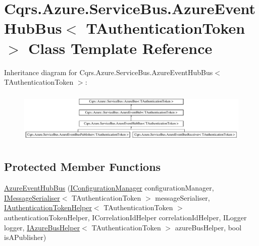 \hypertarget{classCqrs_1_1Azure_1_1ServiceBus_1_1AzureEventHubBus}{}\section{Cqrs.\+Azure.\+Service\+Bus.\+Azure\+Event\+Hub\+Bus$<$ T\+Authentication\+Token $>$ Class Template Reference}
\label{classCqrs_1_1Azure_1_1ServiceBus_1_1AzureEventHubBus}
Inheritance diagram for Cqrs.\+Azure.\+Service\+Bus.\+Azure\+Event\+Hub\+Bus$<$ T\+Authentication\+Token $>$\+:\begin{figure}[H]
\begin{center}
\leavevmode
\includegraphics[height=2.533937cm]{classCqrs_1_1Azure_1_1ServiceBus_1_1AzureEventHubBus}
\end{center}
\end{figure}
\subsection*{Protected Member Functions}
\begin{DoxyCompactItemize}
\item 
\hyperlink{classCqrs_1_1Azure_1_1ServiceBus_1_1AzureEventHubBus_aef24d23dd76d6bb0f58b582e2abf9872_aef24d23dd76d6bb0f58b582e2abf9872}{Azure\+Event\+Hub\+Bus} (\hyperlink{interfaceCqrs_1_1Configuration_1_1IConfigurationManager}{I\+Configuration\+Manager} configuration\+Manager, \hyperlink{interfaceCqrs_1_1Azure_1_1ServiceBus_1_1IMessageSerialiser}{I\+Message\+Serialiser}$<$ T\+Authentication\+Token $>$ message\+Serialiser, \hyperlink{interfaceCqrs_1_1Authentication_1_1IAuthenticationTokenHelper}{I\+Authentication\+Token\+Helper}$<$ T\+Authentication\+Token $>$ authentication\+Token\+Helper, I\+Correlation\+Id\+Helper correlation\+Id\+Helper, I\+Logger logger, \hyperlink{interfaceCqrs_1_1Azure_1_1ServiceBus_1_1IAzureBusHelper}{I\+Azure\+Bus\+Helper}$<$ T\+Authentication\+Token $>$ azure\+Bus\+Helper, bool is\+A\+Publisher)
\end{DoxyCompactItemize}
